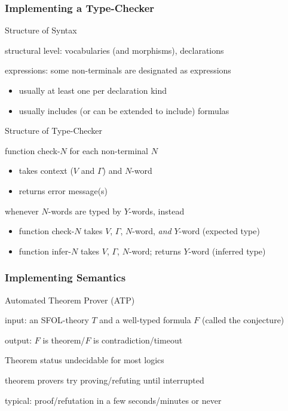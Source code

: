 \begin{frame}\frametitle{Implementing a Type-Checker}
\begin{blockitems}{Structure of Syntax}
\item structural level: vocabularies (and morphisms), declarations
\item expressions: some non-terminals are designated as expressions
 \begin{itemize}
 \item usually at least one per declaration kind
 \item usually includes (or can be extended to include) formulas
 \end{itemize}
\end{blockitems}

\begin{blockitems}{Structure of Type-Checker}
\item function check-$N$ for each non-terminal $N$
 \begin{itemize}
 \item takes context ($V$ and $\Gamma$) and $N$-word
 \item returns error message(s)
 \end{itemize}
\item whenever $N$-words are typed by $Y$-words, instead
 \begin{itemize}
 \item function check-$N$ takes $V$, $\Gamma$, $N$-word, \emph{and} $Y$-word (expected type)
 \item function infer-$N$ takes $V$, $\Gamma$, $N$-word; returns $Y$-word (inferred type)
 \end{itemize}
\end{blockitems}
\end{frame}


\begin{frame}\frametitle{Implementing Semantics}
\begin{blockitems}{Automated Theorem Prover (ATP)}
\item input: an SFOL-theory $T$ and a well-typed formula $F$ (called the conjecture)
\item output: $F$ is theorem/$F$ is contradiction/timeout
\end{blockitems}

\begin{blockitems}{Theorem status undecidable for most logics}
\item theorem provers try proving/refuting until interrupted
\item typical: proof/refutation in a few seconds/minutes or never
\end{blockitems}

\end{frame}

